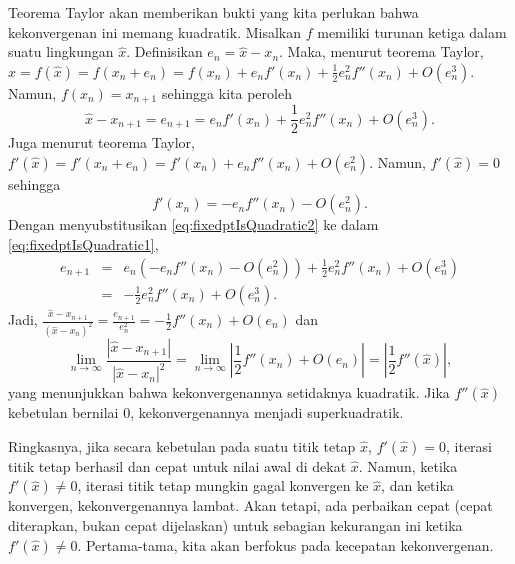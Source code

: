 \label{FixedPointIterationConvergesQuadratically}Teorema Taylor akan
memberikan bukti yang kita perlukan bahwa kekonvergenan ini memang
kuadratik. Misalkan $f$ memiliki turunan ketiga dalam suatu lingkungan
$\hat{x}$. Definisikan $e_{n}=\hat{x}-x_{n}$. Maka, menurut teorema
Taylor, $\hat{x}=f(\hat{x})=f(x_{n}+e_{n})=f(x_{n})+e_{n}f'(x_{n})+\frac{1}{2}e_{n}^{2}f''(x_{n})+O(e_{n}^{3})$.
Namun, $f(x_{n})=x_{n+1}$ sehingga kita peroleh
\begin{equation}
\hat{x}-x_{n+1}=e_{n+1}=e_{n}f'(x_{n})+\frac{1}{2}e_{n}^{2}f''(x_{n})+O(e_{n}^{3}).\label{eq:fixedptIsQuadratic1}
\end{equation}
Juga menurut teorema Taylor, $f'(\hat{x})=f'(x_{n}+e_{n})=f'(x_{n})+e_{n}f''(x_{n})+O(e_{n}^{2})$.
Namun, $f'(\hat{x})=0$ sehingga
\begin{equation}
f'(x_{n})=-e_{n}f''(x_{n})-O(e_{n}^{2}).\label{eq:fixedptIsQuadratic2}
\end{equation}
Dengan menyubstitusikan \ref{eq:fixedptIsQuadratic2} ke dalam \ref{eq:fixedptIsQuadratic1},
\begin{eqnarray*}
e_{n+1} & = & e_{n}(-e_{n}f''(x_{n})-O(e_{n}^{2}))+\frac{1}{2}e_{n}^{2}f''(x_{n})+O(e_{n}^{3})\\
 & = & -\frac{1}{2}e_{n}^{2}f''(x_{n})+O(e_{n}^{3}).
\end{eqnarray*}
Jadi, $\frac{\hat{x}-x_{n+1}}{(\hat{x}-x_{n})^{2}}=\frac{e_{n+1}}{e_{n}^{2}}=-\frac{1}{2}f''(x_{n})+O(e_{n})$
dan
\[
\lim_{n\to\infty}\frac{|\hat{x}-x_{n+1}|}{|\hat{x}-x_{n}|^{2}}=\lim_{n\to\infty}\left|\frac{1}{2}f''(x_{n})+O(e_{n})\right|=\left|\frac{1}{2}f''(\hat{x})\right|,
\]
yang menunjukkan bahwa kekonvergenannya setidaknya kuadratik. Jika
$f''(\hat{x})$ kebetulan bernilai 0, kekonvergenannya menjadi superkuadratik.

Ringkasnya, jika secara kebetulan pada suatu titik tetap $\hat{x}$,
$f'(\hat{x})=0$, iterasi titik tetap berhasil dan cepat untuk nilai
awal di dekat $\hat{x}$. Namun, ketika $f'(\hat{x})\neq0$, iterasi
titik tetap mungkin gagal konvergen ke $\hat{x}$, dan ketika konvergen,
kekonvergenannya lambat. Akan tetapi, ada perbaikan cepat (cepat diterapkan,
bukan cepat dijelaskan) untuk sebagian kekurangan ini ketika $f'(\hat{x})\neq0$.
Pertama-tama, kita akan berfokus pada kecepatan kekonvergenan.

